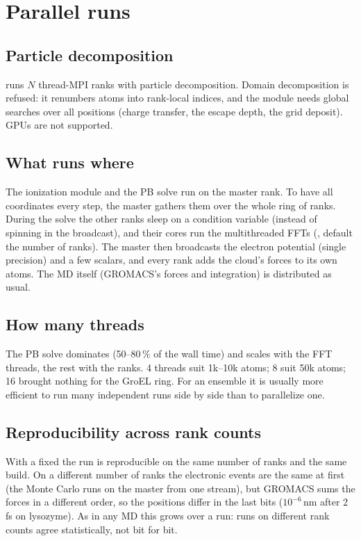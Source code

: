 \chapter{Parallel runs}
\label{app:parallel}

\section{Particle decomposition}

 runs $N$ thread-MPI ranks with particle decomposition.
Domain decomposition is refused: it renumbers atoms into rank-local indices, and the module needs global searches over
all positions (charge transfer, the escape depth, the grid deposit).
GPUs are not supported.

\section{What runs where}

The ionization module and the PB solve run on the master rank.
To have all coordinates every step, the master gathers them over the whole ring of ranks.
During the solve the other ranks sleep on a condition variable (instead of spinning in the broadcast), and their cores
run the multithreaded FFTs (, default the number of ranks).
The master then broadcasts the electron potential (single precision) and a few scalars, and every rank adds the cloud's
forces to its own atoms.
The MD itself (GROMACS's forces and integration) is distributed as usual.

\section{How many threads}

The PB solve dominates (50--80\,\% of the wall time) and scales with the FFT threads, the rest with the ranks.
4 threads suit 1k--10k atoms; 8 suit 50k atoms; 16 brought nothing for the GroEL ring.
For an ensemble it is usually more efficient to run many independent runs side by side than to parallelize one.

\section{Reproducibility across rank counts}

With a fixed  the run is reproducible on the same number of ranks and the same build.
On a different number of ranks the electronic events are the same at first (the Monte Carlo runs on the master from one
stream), but GROMACS sums the forces in a different order, so the positions differ in the last bits ($10^{-6}$\,nm
after 2\,fs on lysozyme).
As in any MD this grows over a run: runs on different rank counts agree statistically, not bit for bit.
